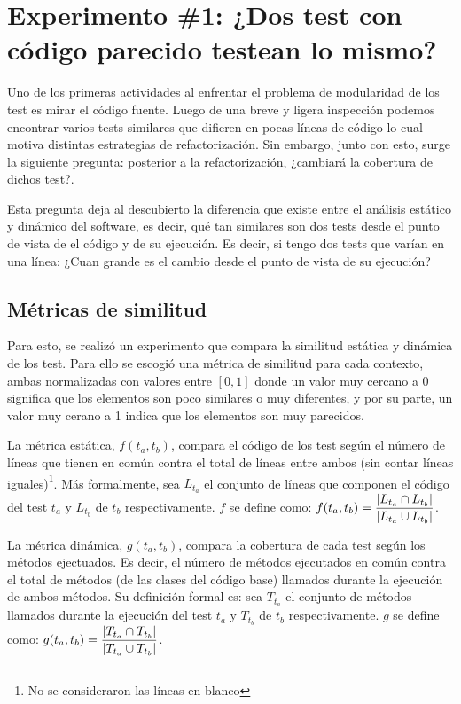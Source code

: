 \chapter{Experimento \#1: ¿Dos test con código parecido testean lo mismo? }

\par Uno de los primeras actividades al enfrentar el problema de modularidad de los test es mirar el código fuente. Luego de una breve y ligera inspección podemos encontrar varios tests similares que difieren en pocas líneas de código lo cual motiva distintas estrategias de refactorización. Sin embargo, junto con esto, surge la siguiente pregunta: posterior a la refactorización, ¿cambiará la cobertura de dichos test?. 

\par Esta pregunta deja al descubierto la diferencia que existe entre el análisis estático y dinámico del software, es decir, qué tan similares son dos tests desde el punto de vista de el código y de su ejecución. Es decir, si tengo dos tests que varían en una línea: ¿Cuan grande es el cambio desde el punto de vista de su ejecución?

\section{Métricas de similitud}
\par Para esto, se realizó un experimento que compara la similitud estática y dinámica de los test. Para ello se escogió una métrica de similitud para cada contexto, ambas normalizadas con valores entre $\left[ 0 , 1 \right]$ donde un valor muy cercano a $0$ significa que los elementos son poco similares o muy diferentes, y por su parte, un valor muy cerano a 1 indica que los elementos son muy parecidos. 

\par La métrica estática, $f(t_a,t_b)$, compara el código de los test según el número de líneas que tienen en común contra el total de líneas entre ambos (sin contar líneas iguales)\footnote{No se consideraron las líneas en blanco}. Más formalmente, sea $L_{t_a}$ el conjunto de líneas que componen el código del test $t_a$ y  $L_{t_b}$ de $t_b$ respectivamente. $f$ se define como: $f(t_a,t_b)= \dfrac{\vert L_{t_a} \cap L_{t_b} \vert}{\vert L_{t_a} \cup L_{t_b} \vert}$.


\par La métrica dinámica, $g(t_a,t_b)$, compara la cobertura de cada test según los métodos ejectuados. Es decir, el número de métodos ejecutados en común contra el total de métodos (de las clases del código base) llamados durante la ejecución de ambos métodos. Su definición formal es: sea $T_{t_a}$ el conjunto de métodos llamados durante la ejecución del test $t_a$ y  $T_{t_b}$ de $t_b$ respectivamente. $g$ se define como: $g(t_a,t_b)= \dfrac{\vert T_{t_a} \cap T_{t_b} \vert}{\vert T_{t_a} \cup T_{t_b} \vert}$.